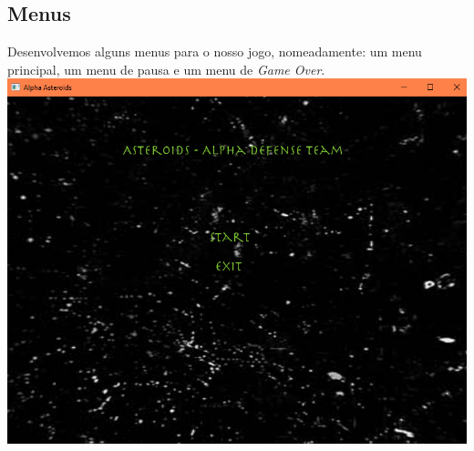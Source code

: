\subsection{Menus}
Desenvolvemos alguns menus para o nosso jogo, nomeadamente: um menu principal, um menu de pausa e um menu de \emph{Game Over}.
\linebreak
\linebreak
\includegraphics[scale=0.5]{menu.png}